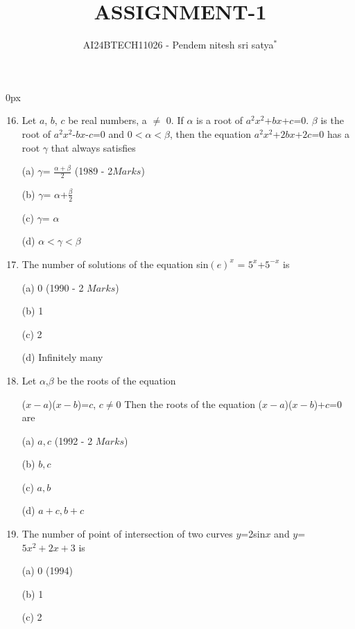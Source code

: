 \documentclass[journal,12pt,twocolumn]{IEEEtran}
\theoremstyle{remark}
\begin{document}
\parindent 0px


\vspace{3cm}

\title{ASSIGNMENT-1}
\author{AI24BTECH11026 - Pendem nitesh sri satya$^{*}$%
}
\maketitle
\newpage
\bigskip

\renewcommand{\thefigure}{\theenumi}
\renewcommand{\thetable}{\theenumi}
\begin{enumerate}

\setcounter{enumi}{15}

 \item Let $a$, $b$, $c$ be real numbers, a $\neq$ 0. If $\alpha$ is a root of $a^2x^2$+$bx$+$c$=0. $\beta$ is the root of $a^2x^2$-$bx$-$c$=0 and 0$<$$\alpha$$<$$\beta$, then the equation $a^2x^2$+$2bx$+$2c$=0 has a root $\gamma$ that always satisfies 

(a) $\gamma$= $\frac{\alpha+\beta}{2}$  \hfill (1989 - 2$ Marks$)

(b) $\gamma$=  $\alpha$+$\frac{\beta}{2}$

(c) $\gamma$= $\alpha$

(d) $\alpha$$<$$\gamma$$<$$\beta$

 \item The number of solutions of the equation sin$(e)^x$ = $5^x$+$5^{-x}$ is 

(a) 0 \hfill (1990 - 2 $Marks$)

(b) 1

(c) 2

(d) Infinitely many

 \item Let $\alpha$,$\beta$ be the roots of the equation 

($x-a$)($x-b$)=$c$, $c \neq 0$ Then the roots of the equation ($x-a$)($x-b$)+$c$=0 are 

(a) $a,c$ \hfill (1992 - 2 $Marks$)

(b) $b,c$

(c) $a,b$

(d) $a+c,b+c$

 \item The number of point of intersection of two curves $y$=2sin$x$ and $y$=$5x^2+2x+3$ is 

(a) 0 \hfill (1994)

(b) 1

(c) 2


\end{enumerate}
\end{document}
